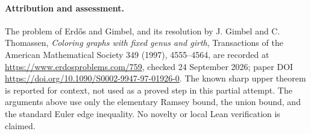 \paragraph{Attribution and assessment.}
The problem of Erd\H{o}s and Gimbel, and its resolution by J. Gimbel and C. Thomassen, \emph{Coloring graphs with fixed genus and girth}, Transactions of the American Mathematical Society 349 (1997), 4555--4564, are recorded at \url{https://www.erdosproblems.com/759}, checked 24 September 2026; paper DOI \url{https://doi.org/10.1090/S0002-9947-97-01926-0}. The known sharp upper theorem is reported for context, not used as a proved step in this partial attempt. The arguments above use only the elementary Ramsey bound, the union bound, and the standard Euler edge inequality. No novelty or local Lean verification is claimed.
